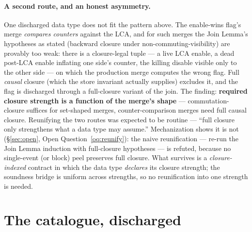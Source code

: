 \documentclass[11pt]{article}
\begin{document}
\paragraph{A second route, and an honest asymmetry.} One discharged data
type does not fit the pattern above. The enable-wins flag's merge
\emph{compares counters} against the LCA, and for such merges the Join
Lemma's hypotheses as stated (backward closure under
non-commuting-visibility) are provably too weak: there is a
closure-legal tuple --- a live LCA enable, a dead post-LCA enable
inflating one side's counter, the killing disable visible only to the
other side --- on which the production merge computes the wrong flag. Full
\emph{causal} closure (which the store invariant actually supplies)
excludes it, and the flag is discharged through a full-closure variant of
the join. The finding: \textbf{required closure strength is a function of
the merge's shape} --- commutation-closure suffices for set-shaped merges,
counter-comparison merges need full causal closure. Reunifying the two
routes was expected to be routine --- ``full closure only strengthens what
a data type may assume.'' Mechanization shows it is not (\S\ref{sec:open},
Open Question~\ref{oq:reunify}): the naive reunification --- re-run the
Join Lemma induction with full-closure hypotheses --- is refuted, because
no single-event (or block) peel preserves full closure. What survives is a
\emph{closure-indexed} contract in which the data type \emph{declares} its
closure strength; the soundness bridge is uniform across strengths, so no
reunification into one strength is needed.

\section{The catalogue, discharged}
\label{sec:catalog}
\end{document}
